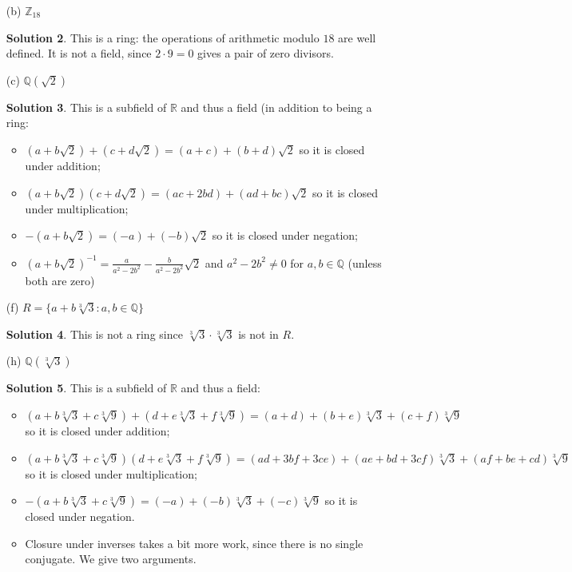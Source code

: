\documentclass{article}
\newcommand{\RR}{\mathbb{R}}
\newcommand{\QQ}{\mathbb{Q}}
\newcommand{\ZZ}{\mathbb{Z}}
\theoremstyle{definition}
\newtheorem*{solution}{Solution}
\begin{document}
\begin{enumerate}
\begin{enumerate}
\begin{solution}
\begin{itemize}
\end{itemize}
\end{solution}
It is not a field since it does not have an identity.
\item[(b)] $\ZZ_{18}$
\begin{solution}
This is a ring: the operations of arithmetic modulo $18$ are well defined.  It is not a field, since $2 \cdot 9 = 0$ gives a pair of zero divisors.
\end{solution}
\item[(c)] $\QQ(\sqrt{2})$
\begin{solution}
This is a subfield of $\RR$ and thus a field (in addition to being a ring:
\begin{itemize}
\item $(a + b\sqrt{2}) + (c + d\sqrt{2}) = (a + c) + (b + d)\sqrt{2}$ so it is closed under addition;
\item $(a + b\sqrt{2})(c+d\sqrt{2}) = (ac + 2bd) + (ad + bc)\sqrt{2}$ so it is closed under multiplication;
\item $-(a + b\sqrt{2}) = (-a) + (-b)\sqrt{2}$ so it is closed under negation;
\item $(a + b\sqrt{2})^{-1} = \frac{a}{a^2 - 2b^2} - \frac{b}{a^2 - 2b^2}\sqrt{2}$ and $a^2 - 2b^2 \ne 0$ for $a,b \in \QQ$ (unless both are zero)
\end{itemize}
\end{solution}
\item[(f)] $R = \{a + b\sqrt[3]{3} : a, b \in \QQ\}$
\begin{solution}
This is not a ring since $\sqrt[3]{3} \cdot \sqrt[3]{3}$ is not in $R$.
\end{solution}
\item[(h)] $\QQ(\sqrt[3]{3})$
\begin{solution}
This is a subfield of $\RR$ and thus a field:
\begin{itemize}
\item $(a + b\sqrt[3]{3} + c\sqrt[3]{9}) + (d + e\sqrt[3]{3} + f\sqrt[3]{9}) = (a+d) + (b+e)\sqrt[3]{3} + (c+f)\sqrt[3]{9}$ so it is closed under addition;
\item $(a + b\sqrt[3]{3} + c\sqrt[3]{9})(d + e\sqrt[3]{3} + f\sqrt[3]{9}) = (ad + 3bf + 3ce) + (ae + bd + 3cf)\sqrt[3]{3} + (af + be + cd)\sqrt[3]{9}$ so it is closed under multiplication;
\item $-(a + b\sqrt[3]{3} + c\sqrt[3]{9}) = (-a) + (-b)\sqrt[3]{3} + (-c)\sqrt[3]{9}$ so it is closed under negation.
\item Closure under inverses takes a bit more work, since there is no single conjugate.  We give two arguments.

\end{itemize}
\end{solution}
\end{enumerate}
\end{enumerate}
\end{document}
